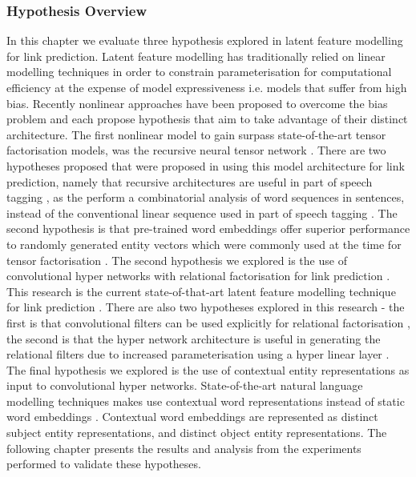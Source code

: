 \subsubsection{Hypothesis Overview}
In this chapter we evaluate three hypothesis explored in latent feature modelling for link prediction. Latent feature modelling has traditionally relied on linear modelling techniques in order to constrain parameterisation for computational efficiency at the expense of model expressiveness i.e. models that suffer from high bias. Recently nonlinear approaches have been proposed to overcome the bias problem and each propose hypothesis that aim to take advantage of their distinct architecture. The first nonlinear model to gain surpass state-of-the-art tensor factorisation models, was the recursive neural tensor network \cite{refefence}. There are two hypotheses proposed that were proposed in using this model architecture for link prediction, namely that recursive architectures are useful in part of speech tagging \cite{reference}, as the perform a combinatorial analysis of word sequences in sentences, instead of the conventional linear sequence used in part of speech tagging \cite{reference}. The second hypothesis is that pre-trained word embeddings offer superior performance to randomly generated entity vectors which were commonly used at the time for tensor factorisation \cite{reference}. \newline
The second hypothesis we explored is the use of convolutional hyper networks with relational factorisation for link prediction \cite{reference}. This research is the current state-of-that-art latent feature modelling technique for link prediction \cite{reference}. There are also two hypotheses explored in this research - the first is that convolutional filters can be used explicitly for relational factorisation \cite{reference}, the second is that the hyper network architecture is useful in generating the relational filters due to increased parameterisation using a hyper linear layer \cite{reference}. \newline
The final hypothesis we explored is the use of contextual entity representations as input to convolutional hyper networks. State-of-the-art natural language modelling techniques makes use contextual word representations \cite{Elmo, Bert} instead of static word embeddings \cite{fasttext, GloVe, Word2Vec}. Contextual word embeddings are represented as distinct subject entity representations, and distinct object entity representations. \newline
The following chapter presents the results and analysis from the experiments performed to validate these hypotheses.


